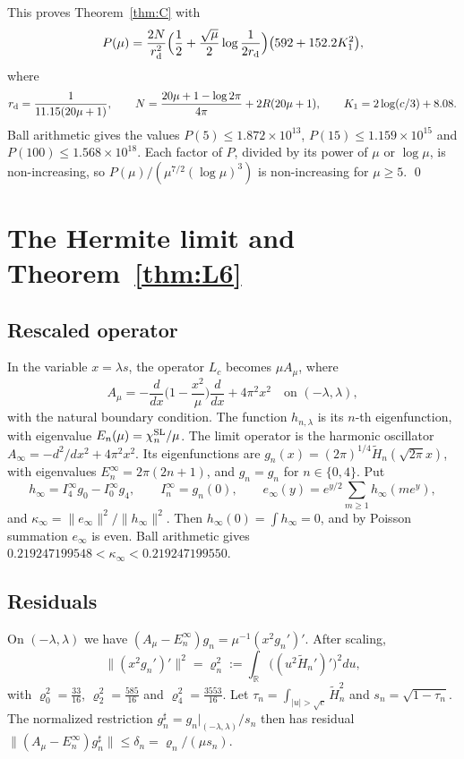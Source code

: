 \documentclass[11pt]{amsart}
\theoremstyle{remark}
\numberwithin{equation}{section}
\newcommand{\R}{\mathbb{R}}
\begin{document}
This proves Theorem~\ref{thm:C} with
\begin{equation}\label{eq:P}
P(\mu)=\frac{2N}{r_{\rm d}^2}\Big(\frac12+\frac{\sqrt\mu}2\log\frac1{2r_{\rm d}}\Big)\big(592+152.2K_1^2\big),
\end{equation}
where
\[
r_{\rm d}=\frac1{11.15(20\mu+1)},\qquad N=\frac{20\mu+1-\log2\pi}{4\pi}+2R(20\mu+1),\qquad K_1=2\log(c/3)+8.08 .
\]
Ball arithmetic gives the values $P(5)\le1.872\times10^{13}$, $P(15)\le1.159\times10^{15}$ and $P(100)\le1.568\times10^{18}$. Each factor of $P$, divided by its power of $\mu$ or $\log\mu$, is non-increasing, so $P(\mu)/(\mu^{7/2}(\log\mu)^3)$ is non-increasing for $\mu\ge5$. \qed

\section{The Hermite limit and Theorem~\ref{thm:L6}}\label{sec:L6}

\subsection{Rescaled operator}
In the variable $x=\lambda s$, the operator $L_c$ becomes $\mu A_\mu$, where
\[
A_\mu=-\frac d{dx}\Big(1-\frac{x^2}\mu\Big)\frac d{dx}+4\pi^2x^2\quad\text{on }(-\lambda,\lambda),
\]
with the natural boundary condition. The function $h_{n,\lambda}$ is its $n$-th eigenfunction, with eigenvalue $E_n(\mu)=\chi_n^{\rm SL}/\mu$. The limit operator is the harmonic oscillator $A_\infty=-d^2/dx^2+4\pi^2x^2$. Its eigenfunctions are $g_n(x)=(2\pi)^{1/4}\tilde H_n(\sqrt{2\pi}x)$, with eigenvalues $E_n^\infty=2\pi(2n+1)$, and $\hat g_n=g_n$ for $n\in\{0,4\}$. Put
\[
h_\infty=I_4^\infty g_0-I_0^\infty g_4,\qquad I_n^\infty=g_n(0),\qquad e_\infty(y)=e^{y/2}\sum_{m\ge1}h_\infty(me^y),
\]
and $\kappa_\infty=\|e_\infty\|^2/\|h_\infty\|^2$. Then $h_\infty(0)=\int h_\infty=0$, and by Poisson summation $e_\infty$ is even. Ball arithmetic gives $0.219247199548<\kappa_\infty<0.219247199550$.

\subsection{Residuals}
On $(-\lambda,\lambda)$ we have $(A_\mu-E_n^\infty)g_n=\mu^{-1}(x^2g_n')'$. After scaling,
\[
\|(x^2g_n')'\|^2=\varrho_n^2:=\int_\R\big((u^2\tilde H_n')'\big)^2du,
\]
with $\varrho_0^2=\frac{33}{16}$, $\varrho_2^2=\frac{585}{16}$ and $\varrho_4^2=\frac{3553}{16}$. Let $\tau_n=\int_{|u|>\sqrt c}\tilde H_n^2$ and $s_n=\sqrt{1-\tau_n}$. The normalized restriction $g_n^\sharp=g_n|_{(-\lambda,\lambda)}/s_n$ then has residual $\|(A_\mu-E_n^\infty)g_n^\sharp\|\le\delta_n=\varrho_n/(\mu s_n)$.
\end{document}
